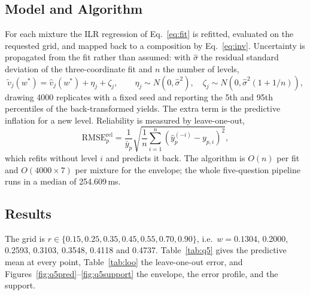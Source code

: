 \documentclass[withoutpreface,bwprint]{apmcmthesis}
\begin{document}
\subsection{Model and Algorithm}
For each mixture the ILR regression of Eq.~\eqref{eq:fit} is refitted, evaluated on the requested grid, and mapped back to a composition by Eq.~\eqref{eq:inv}. Uncertainty is propagated from the fit rather than assumed: with $\hat\sigma$ the residual standard deviation of the three-coordinate fit and $n$ the number of levels,
\begin{equation}
\tilde v_j(w^\ast)=\hat v_j(w^\ast)+\eta_j+\zeta_j,\qquad
\eta_j\sim N(0,\hat\sigma^2),\quad \zeta_j\sim N\!\left(0,\hat\sigma^2(1+1/n)\right),
\label{eq:mc}
\end{equation}
drawing 4000 replicates with a fixed seed and reporting the 5th and 95th percentiles of the back-transformed yields. The extra term is the predictive inflation for a new level. Reliability is measured by leave-one-out,
\begin{equation}
\mathrm{RMSE}^{\mathrm{rel}}_p=\frac{1}{\bar y_p}\sqrt{\frac{1}{n}\sum_{i=1}^{n}\left(\hat y_{p}^{(-i)}-y_{p,i}\right)^2},
\label{eq:loo}
\end{equation}
which refits without level $i$ and predicts it back. The algorithm is $O(n)$ per fit and $O(4000\times7)$ per mixture for the envelope; the whole five-question pipeline runs in a median of 254.609\,ms.

\subsection{Results}
The grid is $r\in\{0.15,0.25,0.35,0.45,0.55,0.70,0.90\}$, i.e.\ $w=0.1304$, 0.2000, 0.2593, 0.3103, 0.3548, 0.4118 and 0.4737. Table~\ref{tab:q5} gives the predictive mean at every point, Table~\ref{tab:loo} the leave-one-out error, and Figures~\ref{fig:q5pred}--\ref{fig:q5support} the envelope, the error profile, and the support.
\end{document}
